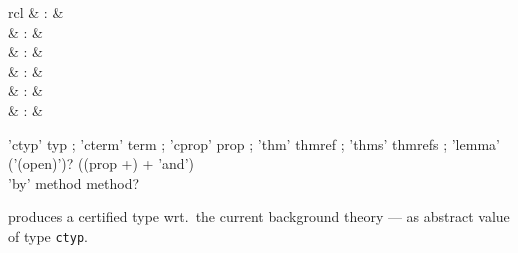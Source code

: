 \begin{isabellebody}
\begin{isamarkuptext}
\begin{description}
  \end{description}%
\end{isamarkuptext}%
\isamarkuptrue%
%
\endisatagmlref
{\isafoldmlref}%
%
\isadelimmlref
%
\endisadelimmlref
%
\isadelimmlantiq
%
\endisadelimmlantiq
%
\isatagmlantiq
%
\begin{isamarkuptext}%
\begin{matharray}{rcl}
  \hypertarget{ML antiquotation.ctyp}{\hyperlink{ML antiquotation.ctyp}{\mbox{}}} & : &  \\
  \hypertarget{ML antiquotation.cterm}{\hyperlink{ML antiquotation.cterm}{\mbox{}}} & : &  \\
  \hypertarget{ML antiquotation.cprop}{\hyperlink{ML antiquotation.cprop}{\mbox{}}} & : &  \\
  \hypertarget{ML antiquotation.thm}{\hyperlink{ML antiquotation.thm}{\mbox{}}} & : &  \\
  \hypertarget{ML antiquotation.thms}{\hyperlink{ML antiquotation.thms}{\mbox{}}} & : &  \\
  \hypertarget{ML antiquotation.lemma}{\hyperlink{ML antiquotation.lemma}{\mbox{}}} & : &  \\
  \end{matharray}

  \begin{rail}
  'ctyp' typ
  ;
  'cterm' term
  ;
  'cprop' prop
  ;
  'thm' thmref
  ;
  'thms' thmrefs
  ;
  'lemma' ('(open)')? ((prop +) + 'and') \\ 'by' method method?
  \end{rail}

  \begin{description}

  \item {} produces a certified type wrt.\ the
  current background theory --- as abstract value of type \verb|ctyp|.


\end{description}
\end{isamarkuptext}
\end{isabellebody}
